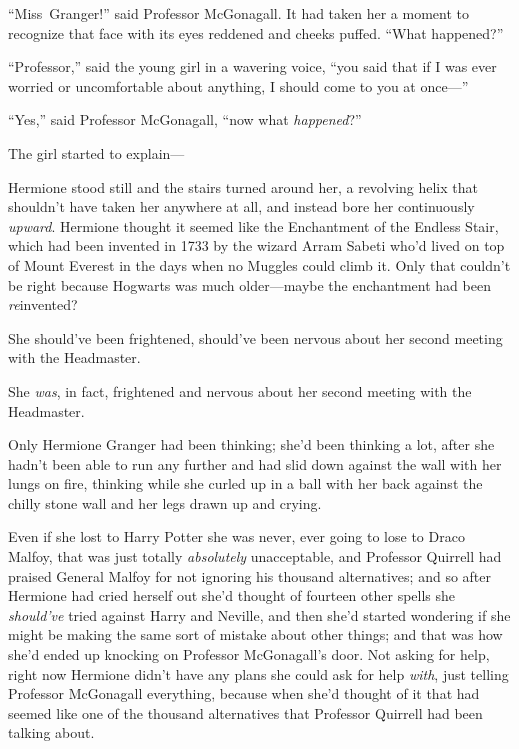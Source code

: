“Miss~Granger!” said Professor McGonagall. It had taken her a moment to recognize that face with its eyes reddened and cheeks puffed.
“What happened?”

“Professor,” said the young girl in a wavering voice, “you said that if I was ever worried or uncomfortable about anything, I should come to you at once—”

“Yes,” said Professor McGonagall, “now what \emph{happened}?”

The girl started to explain—

\later

Hermione stood still and the stairs turned around her, a revolving helix that shouldn’t have taken her anywhere at all, and instead bore her continuously \emph{upward}. Hermione thought it seemed like the Enchantment of the Endless Stair, which had been invented in 1733 by the wizard Arram Sabeti who’d lived on top of Mount Everest in the days when no Muggles could climb it. Only that couldn’t be right because Hogwarts was much older—maybe the enchantment had been \emph{re}invented?

She should’ve been frightened, should’ve been nervous about her second meeting with the Headmaster.

She \emph{was}, in fact, frightened and nervous about her second meeting with the Headmaster.

Only Hermione Granger had been thinking; she’d been thinking a lot, after she hadn’t been able to run any further and had slid down against the wall with her lungs on fire, thinking while she curled up in a ball with her back against the chilly stone wall and her legs drawn up and crying.

Even if she lost to Harry Potter she was never, ever going to lose to Draco Malfoy, that was just totally \emph{absolutely} unacceptable, and Professor Quirrell had praised General Malfoy for not ignoring his thousand alternatives; and so after Hermione had cried herself out she’d thought of fourteen other spells she \emph{should’ve} tried against Harry and Neville, and then she’d started wondering if she might be making the same sort of mistake about other things; and that was how she’d ended up knocking on Professor McGonagall’s door. Not asking for help, right now Hermione didn’t have any plans she could ask for help \emph{with}, just telling Professor McGonagall everything, because when she’d thought of it that had seemed like one of the thousand alternatives that Professor Quirrell had been talking about.

